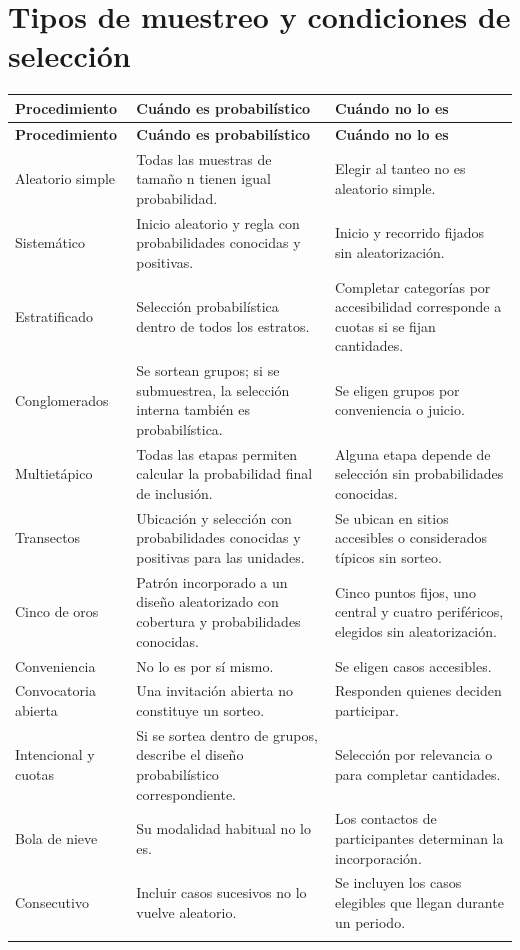 \documentclass[11pt,letterpaper]{article}
\begin{document}
\section{Tipos de muestreo y condiciones de selección}
{\small
\begin{longtable}{>{\raggedright\arraybackslash}p{}>{\raggedright\arraybackslash}p{}>{\raggedright\arraybackslash}p{}}
\toprule
\rowcolor{cabecera}
\textbf{Procedimiento} & \textbf{Cuándo es probabilístico} & \textbf{Cuándo no lo es} \\ \midrule
\endfirsthead
\toprule
\rowcolor{cabecera}\textbf{Procedimiento} & \textbf{Cuándo es probabilístico} & \textbf{Cuándo no lo es} \\ \midrule
\endhead
Aleatorio simple & Todas las muestras de tamaño n tienen igual probabilidad. & Elegir al tanteo no es aleatorio simple. \\ \addlinespace[2pt]
Sistemático & Inicio aleatorio y regla con probabilidades conocidas y positivas. & Inicio y recorrido fijados sin aleatorización. \\ \addlinespace[2pt]
Estratificado & Selección probabilística dentro de todos los estratos. & Completar categorías por accesibilidad corresponde a cuotas si se fijan cantidades. \\ \addlinespace[2pt]
Conglomerados & Se sortean grupos; si se submuestrea, la selección interna también es probabilística. & Se eligen grupos por conveniencia o juicio. \\ \addlinespace[2pt]
Multietápico & Todas las etapas permiten calcular la probabilidad final de inclusión. & Alguna etapa depende de selección sin probabilidades conocidas. \\ \addlinespace[2pt]
Transectos & Ubicación y selección con probabilidades conocidas y positivas para las unidades. & Se ubican en sitios accesibles o considerados típicos sin sorteo. \\ \addlinespace[2pt]
Cinco de oros & Patrón incorporado a un diseño aleatorizado con cobertura y probabilidades conocidas. & Cinco puntos fijos, uno central y cuatro periféricos, elegidos sin aleatorización. \\ \addlinespace[2pt]
Conveniencia & No lo es por sí mismo. & Se eligen casos accesibles. \\ \addlinespace[2pt]
Convocatoria abierta & Una invitación abierta no constituye un sorteo. & Responden quienes deciden participar. \\ \addlinespace[2pt]
Intencional y cuotas & Si se sortea dentro de grupos, describe el diseño probabilístico correspondiente. & Selección por relevancia o para completar cantidades. \\ \addlinespace[2pt]
Bola de nieve & Su modalidad habitual no lo es. & Los contactos de participantes determinan la incorporación. \\ \addlinespace[2pt]
Consecutivo & Incluir casos sucesivos no lo vuelve aleatorio. & Se incluyen los casos elegibles que llegan durante un periodo. \\ \addlinespace[2pt]
\bottomrule
\end{longtable}}
\end{document}
